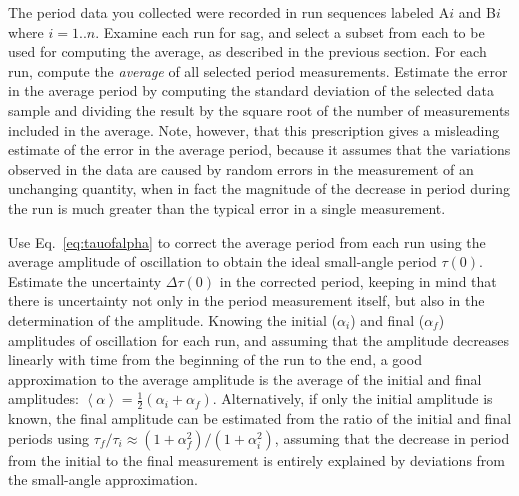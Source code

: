 \documentclass{revtex4}
\begin{document}
The period data you collected were recorded in run sequences labeled A$i$ and
B$i$ where $i=1..n$.  Examine each run for sag, and select a subset from each
to be used for computing the average, as described in the previous section.
For each run, compute the \emph{average} of all selected period
measurements. Estimate the error in the average period by computing
the standard deviation of the selected data sample and dividing the
result by the square root of the number of measurements included in the
average. Note, however, that this prescription gives a misleading
estimate of the error in the average period, because it assumes that the variations observed in the data are caused
by random errors in the measurement of an unchanging quantity, when in
fact the magnitude of the decrease in period during the run is much
greater than the typical error in a single measurement. 

Use Eq.~\eqref{eq:tauofalpha} to correct the average period from each run using the average amplitude of oscillation to
obtain the ideal small-angle period $\tau(0)$. Estimate the
uncertainty $\Delta \tau(0)$ in the corrected period, keeping in
mind that there is uncertainty not only in the period measurement
itself, but also in the determination of the amplitude.  Knowing the initial ($\alpha_i$) and final ($\alpha_f$)
amplitudes of oscillation for each run, and assuming that the amplitude
decreases linearly with time from
the beginning of the run to the end, a good approximation
to the average amplitude is the average of the initial and final
amplitudes: $\left<\alpha \right> =
\frac{1}{2}\left(\alpha_i + \alpha_f \right)$. Alternatively, if only
the initial amplitude is known, the final amplitude can be estimated
from the ratio of the initial and final periods using $\tau_f/\tau_i \approx
(1+\alpha_f^2)/(1+\alpha_i^2)$, assuming that the
decrease in period from the initial to the final measurement is entirely
explained by deviations from the small-angle approximation. 
\end{document}
